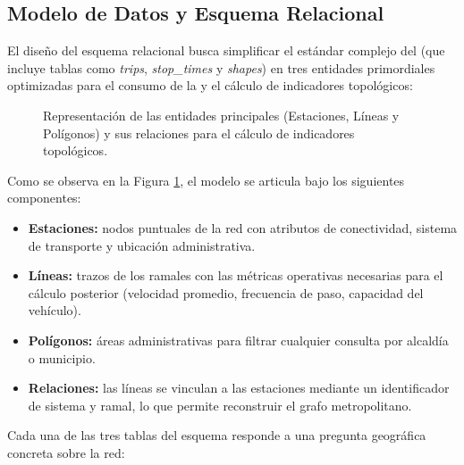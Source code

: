 
\subsection{Modelo de Datos y Esquema Relacional}
\label{subsec:modelo-datos}

\label{subsubsec:EsquemaER}

El diseño del esquema relacional busca simplificar el estándar complejo del
\gtfs{} (que incluye tablas como \textit{trips}, \textit{stop\_times} y
\textit{shapes}) en tres entidades primordiales optimizadas para el consumo de
la \api{} y el cálculo de indicadores topológicos:

\begin{figure}[H]
    \centering
    
    \caption[Esquema Relacional Simplificado de \texttt{Apímetro}]{Representación
    de las entidades principales (Estaciones, Líneas y Polígonos) y sus
    relaciones para el cálculo de indicadores topológicos.}
    \label{fig:diagrama-er}
\end{figure}


Como se observa en la Figura \ref{fig:diagrama-er}, el modelo se articula bajo
los siguientes componentes:

\begin{itemize}
\item \textbf{Estaciones:} nodos puntuales de la red con atributos de
conectividad, sistema de transporte y ubicación administrativa.
\item \textbf{Líneas:} trazos de los ramales con las métricas operativas
necesarias para el cálculo posterior (velocidad promedio, frecuencia de paso,
capacidad del vehículo).
\item \textbf{Polígonos:} áreas administrativas para filtrar cualquier
consulta por alcaldía o municipio.
\item \textbf{Relaciones:} las líneas se vinculan a las estaciones mediante
un identificador de sistema y ramal, lo que permite reconstruir el grafo
metropolitano.
\end{itemize}


\label{subsubsec:DefinicionSQL}

Cada una de las tres tablas del esquema responde a una pregunta geográfica
concreta sobre la red:

